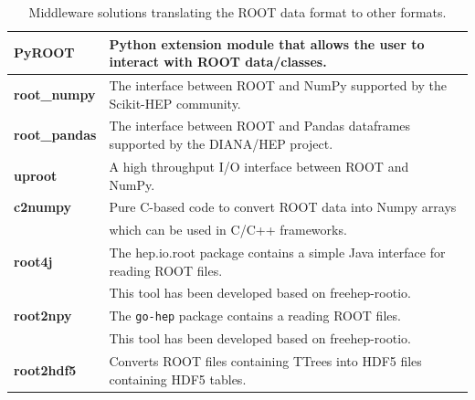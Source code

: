 \begin{table}[htbp]
 \caption{Middleware solutions translating the ROOT data format to other formats.}
 \begin{center}
  \begin{tabular}{|l|l|}
   \hline
   \textbf{PyROOT}       & Python extension module that allows the user to interact with ROOT data/classes.~\cite{PyROOT}          \\
   \hline
   \textbf{root\_numpy}  & The interface between ROOT and NumPy supported by the Scikit-HEP community.~\cite{root_numpy}           \\
   \hline
   \textbf{root\_pandas} & The interface between ROOT and Pandas dataframes supported by the DIANA/HEP project.~\cite{root_pandas} \\
   \hline
   \textbf{uproot}       & A high throughput I/O interface between ROOT and NumPy.~\cite{uproot}                                   \\
   \hline
   \textbf{c2numpy}      & Pure C-based code to convert ROOT data into Numpy arrays                                                \\
                         & which can be used in C/C++ frameworks.~\cite{c2numpy}                                                   \\
   \hline

   \textbf{root4j}       & The hep.io.root package contains a simple Java interface for reading ROOT files.                        \\
                         & This tool has been developed based on freehep-rootio.~\cite{root4j}                                     \\
   \hline

   \textbf{root2npy}     & The \texttt{go-hep} package contains a reading ROOT files.                                              \\
                         & This tool has been developed based on freehep-rootio.~\cite{root4j}                                     \\
   \hline

   \textbf{root2hdf5}    & Converts ROOT files containing TTrees into HDF5 files containing HDF5 tables.~\cite{root2hdf5}          \\
   \hline
  \end{tabular}
 \end{center}
 \label{table:Middleware}
\end{table}

